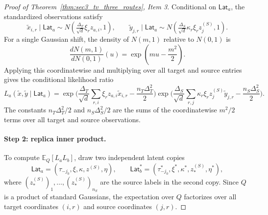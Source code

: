 \documentclass[10pt]{article}
\newcommand{\Ebb}{\mathbb E}
\newcommand{\trg}{T}
\newcommand{\nT}{n_{\trg}}
\newcommand{\DeltaT}{\Delta_{\trg}}
\newcommand{\src}{S}
\newcommand{\nS}{n_{\src}}
\newcommand{\zsrc}{z^{(\src)}}
\newcommand{\DeltaS}{\Delta_{\src}}
\begin{document}
\begin{proof}[Proof of Theorem~\ref{thm:sec3_tv_three_routes}, Item 3]
Conditional on $\mathsf{Lat}_a$, the standardized observations satisfy
\[
    \tilde x_{i,r}\mid\mathsf{Lat}_a\sim N\!\left(\tfrac{\DeltaT}{\sqrt{d}}\xi_r z_{a,i},1\right),
    \qquad
    \tilde y_{j,r}\mid\mathsf{Lat}_a\sim N\!\left(\tfrac{\DeltaS}{\sqrt{d}}\kappa_r\xi_r\zsrc_j,1\right).
\]
For a single Gaussian shift, the density of $N(m,1)$ relative to $N(0,1)$ is
\[
    \frac{dN(m,1)}{dN(0,1)}(u)
    =
    \exp\!\left(mu-\frac{m^2}{2}\right).
\]
Applying this coordinatewise and multiplying over all target and source entries
gives the conditional likelihood ratio
\[
    L_a(\tilde x,\tilde y\mid\mathsf{Lat}_a)
    =
    \exp\!\Biggl(
        \frac{\DeltaT}{\sqrt{d}}\sum_{r,i}\xi_r z_{a,i}\tilde x_{i,r}-\frac{\nT\DeltaT^2}{2}
    \Biggr)
    \exp\!\Biggl(
        \frac{\DeltaS}{\sqrt{d}}\sum_{r,j}\kappa_r\xi_r\zsrc_j\tilde y_{j,r}-\frac{\nS\DeltaS^2}{2}
    \Biggr).
\]
The constants $\nT\DeltaT^2/2$ and $\nS\DeltaS^2/2$ are the sums of the
coordinatewise $m^2/2$ terms over all target and source observations.

\paragraph{Step 2: replica inner product.}
To compute $\Ebb_Q[L_aL_b]$, draw two independent latent copies
\[
    \mathsf{Lat}_a=(\tau_{-j_0},\xi,\kappa,\zsrc,\eta),
    \qquad
    \mathsf{Lat}_b^*=(\tau_{-j_0}^*,\xi^*,\kappa^*,\zsrc_*,\eta^*),
\]
where $(\zsrc_*)_1,\ldots,(\zsrc_*)_{\nS}$ are the source labels in the second
copy.  Since
$Q$ is a product of standard Gaussians, the expectation over $Q$ factorizes
over all target coordinates $(i,r)$ and source coordinates $(j,r)$.


\end{proof}
\end{document}
